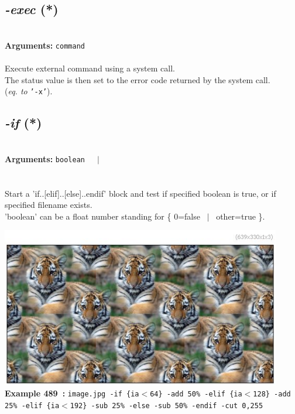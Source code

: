 \documentclass[a4paper,11pt,twoside]{book}
\begin{document}
\subsection{\emph{-exec} (*)}\vspace*{-0.5em}
~\\\textbf{Arguments: } 
{\small \texttt{command}}\\~\\
Execute external command using a system call.
~\\The status value is then set to the error code returned by the system call.
~\\(\emph{eq. to} {\small \texttt{'-x'}}).


\subsection{\emph{-if} (*)}\vspace*{-0.5em}
~\\\textbf{Arguments: } 
{\small \texttt{boolean}}~~~$|$\\
\\~\\
Start a 'if..[elif]..[else]..endif' block and test if specified boolean is true,
or if specified filename exists.
~\\'boolean' can be a float number standing for \{ 0=false ~$|$~ other=true \}.
\begin{center}\includegraphics[keepaspectratio=true,height=7cm,width=\textwidth]{img/gmic_def489.jpg}\\
{\footnotesize \textbf{Example 489~:} \texttt{image.jpg -if \{ia$<$64\} -add 50\% -elif \{ia$<$128\} -add 25\% -elif \{ia$<$192\} -sub 25\% -else -sub 50\% -endif -cut 0,255}}
\end{center}
\end{document}
